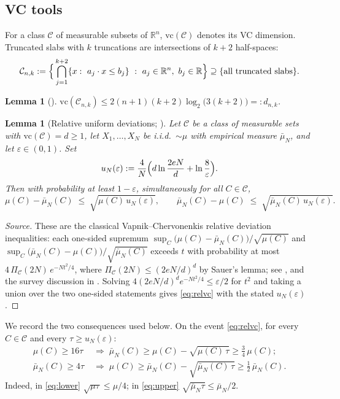 \documentclass[11pt]{article}
\newtheorem{lemma}[theorem]{Lemma}
\newcommand{\R}{\mathbb{R}}
\newcommand{\emp}{\bar\mu_N}
\begin{document}
\subsection{VC tools}

For a class $\mathcal C$ of measurable subsets of $\R^n$, $\mathrm{vc}(\mathcal C)$
denotes its VC dimension.  Truncated slabs with $k$ truncations are intersections of
$k+2$ half-spaces:
\[
\mathcal C_{n,k}:=\Bigl\{\,\bigcap_{j=1}^{k+2}\{x:\ a_j\cdot x\le b_j\}\ :\
a_j\in\R^n,\ b_j\in\R\Bigr\}\supseteq\{\text{all truncated slabs}\}.
\]

\begin{lemma}[{\cite{BEHW}}]\label{lem:vc}
$\mathrm{vc}(\mathcal C_{n,k})\le 2(n+1)(k+2)\log_2\bigl(3(k+2)\bigr)=:d_{n,k}$.
\end{lemma}

\begin{lemma}[Relative uniform deviations; \cite{VC74,Vapnik,AnthonyBartlett}]\label{lem:relvc}
Let $\mathcal C$ be a class of measurable sets with $\mathrm{vc}(\mathcal C)=d\ge1$,
let $X_1,\dots,X_N$ be i.i.d.\ $\sim\mu$ with empirical measure $\emp$, and let
$\varepsilon\in(0,1)$.  Set
\[
u_N(\varepsilon):=\frac{4}{N}\Bigl(d\ln\frac{2eN}{d}+\ln\frac{8}{\varepsilon}\Bigr).
\]
Then with probability at least $1-\varepsilon$, simultaneously for all
$C\in\mathcal C$,
\begin{equation}\label{eq:relvc}
\mu(C)-\emp(C)\;\le\;\sqrt{\mu(C)\,u_N(\varepsilon)},
\qquad
\emp(C)-\mu(C)\;\le\;\sqrt{\emp(C)\,u_N(\varepsilon)} .
\end{equation}
\end{lemma}

\begin{proof}[Source]
These are the classical Vapnik--Chervonenkis relative deviation inequalities: each
one-sided supremum
$\sup_{C}\bigl(\mu(C)-\emp(C)\bigr)/\sqrt{\mu(C)}$ and
$\sup_{C}\bigl(\emp(C)-\mu(C)\bigr)/\sqrt{\emp(C)}$ exceeds $t$ with probability at
most $4\,\Pi_{\mathcal C}(2N)\,e^{-Nt^2/4}$, where
$\Pi_{\mathcal C}(2N)\le(2eN/d)^d$ by Sauer's lemma; see
\cite[Section A.5]{Vapnik}, \cite[Theorem 5.7]{AnthonyBartlett} and the survey
discussion in \cite{BBL}.  Solving
$4(2eN/d)^de^{-Nt^2/4}\le\varepsilon/2$ for $t^2$ and taking a union over the two
one-sided statements gives \eqref{eq:relvc} with the stated $u_N(\varepsilon)$.
\end{proof}

We record the two consequences used below.  On the event \eqref{eq:relvc}, for every
$C\in\mathcal C$ and every $\tau\ge u_N(\varepsilon)$:
\begin{align}
\mu(C)\ge16\tau
&\;\Longrightarrow\;
\emp(C)\ge\mu(C)-\sqrt{\mu(C)\,\tau}\ge\tfrac34\,\mu(C);
\label{eq:lower}\\
\emp(C)\ge4\tau
&\;\Longrightarrow\;
\mu(C)\ge\emp(C)-\sqrt{\emp(C)\,\tau}\ge\tfrac12\,\emp(C).
\label{eq:upper}
\end{align}
Indeed, in \eqref{eq:lower} $\sqrt{\mu\tau}\le\mu/4$; in \eqref{eq:upper}
$\sqrt{\emp\tau}\le\emp/2$.
\end{document}
